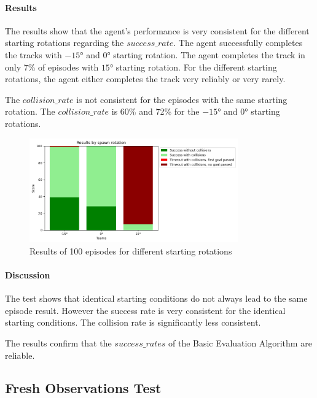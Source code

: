 \paragraph{Results}

The results show that the agent's performance is very consistent for the different starting rotations regarding the $success\_rate$. The agent successfully completes the tracks with $-15°$ and $0°$ starting rotation. The agent completes the track in only 7\% of episodes with $15°$ starting rotation.
For the different starting rotations, the agent either completes the track very reliably or very rarely.

The $collision\_rate$ is not consistent for the episodes with the same starting rotation. The $collision\_rate$ is 60\% and 72\% for the $-15°$ and $0°$ starting rotations. 

\begin{figure}
    \centering
    \includegraphics[width=0.8\textwidth]{Bilder/notebook_images/identicalResults_mixedLightSettings.png}
    \caption{Results of 100 episodes for different starting rotations}
    \label{fig:identical_start_conditions_test_result}
\end{figure}


\paragraph{Discussion}

The test shows that identical starting conditions do not always lead to the same episode result. However the success rate is very consistent for the identical starting conditions. The collision rate is significantly less consistent.

The results confirm that the $success\_rates$ of the Basic Evaluation Algorithm are reliable. 


\subsection{Fresh Observations Test}


